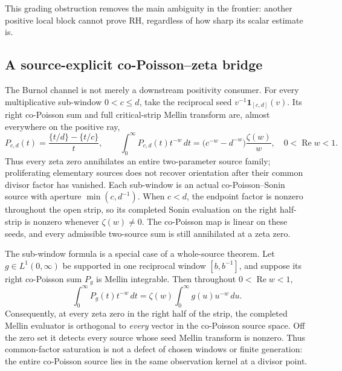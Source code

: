 \documentclass[11pt]{article}
\theoremstyle{definition}
\theoremstyle{remark}
\newcommand{\Rea}{\operatorname{Re}}
\begin{document}
This grading obstruction removes the main ambiguity in the frontier:
another positive local block cannot prove RH, regardless of how sharp
its scalar estimate is.

\subsection{A source-explicit co-Poisson--zeta bridge}

The Burnol channel is not merely a downstream positivity consumer.  For
every multiplicative sub-window \(0<c\le d\), take the reciprocal seed
\(v^{-1}\mathbf 1_{[c,d]}(v)\).  Its right co-Poisson sum and full
critical-strip Mellin transform are, almost everywhere on the positive ray,
\[
 P_{c,d}(t)=\frac{\{t/d\}-\{t/c\}}{t},\qquad
 \int_0^\infty P_{c,d}(t)t^{-w}\,dt
   =\bigl(c^{-w}-d^{-w}\bigr)\frac{\zeta(w)}{w},
 \quad 0<\Rea w<1.
\tag{5.8a}\label{eq:burnol-subwindow-family}
\]
Thus every zeta zero annihilates an entire two-parameter source family;
proliferating elementary sources does not recover orientation after their
common divisor factor has vanished.  Each sub-window is an actual
co-Poisson--Sonin source with aperture \(\min(c,d^{-1})\).  When \(c<d\),
the endpoint factor is nonzero throughout the open strip, so its completed
Sonin evaluation on the right half-strip is nonzero whenever \(\zeta(w)\ne0\).
The co-Poisson map is linear on these seeds, and every admissible two-source
sum is still annihilated at a zeta zero.

The sub-window formula is a special case of a whole-source theorem.  Let
\(g\in L^1(0,\infty)\) be supported in one reciprocal window
\([b,b^{-1}]\), and suppose its right co-Poisson sum \(P_g\) is Mellin
integrable.  Then throughout \(0<\Rea w<1\),
\[
 \int_0^\infty P_g(t)t^{-w}\,dt
   =\zeta(w)\int_0^\infty g(u)u^{-w}\,du.
\tag{5.8b}\label{eq:burnol-general-seed}
\]
Consequently, at every zeta zero in the right half of the strip, the
completed Mellin evaluator is orthogonal to \emph{every} vector in the
co-Poisson source space.  Off the zero set it detects every source whose
seed Mellin transform is nonzero.  Thus common-factor saturation is not a
defect of chosen windows or finite generation: the entire co-Poisson source
lies in the same observation kernel at a divisor point.
\end{document}
